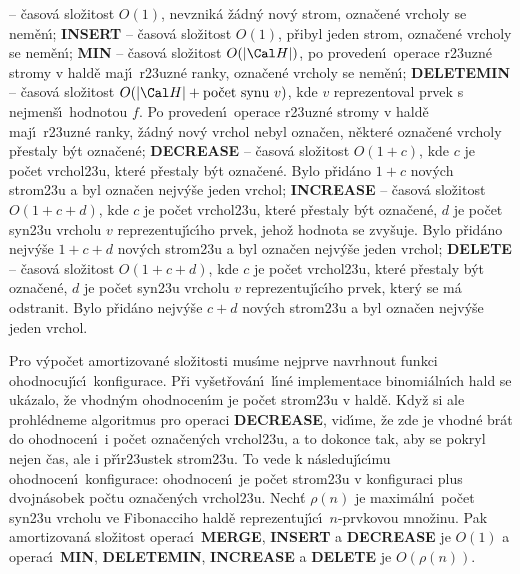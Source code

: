  -- \v casov\'a slo\v zitost $O(1)$, nevznik\'a \v z\'adn\'y 
nov\'y strom, 
ozna\-\v ce\-n\'e vrcholy se nem\v en\'\i ;\newline 
{\bf INSERT} -- \v casov\'a slo\v zitost $O(1)$, p\v ribyl jeden strom, 
ozna\v cen\'e vrcholy se nem\v en\'\i ;\newline 
{\bf MIN} -- \v casov\'a slo\v zitost $O(|\Cal H|)$, po proveden\'\i\ operace 
r\accent23uzn\'e stro\-my v hald\v e maj\'\i\ r\accent23uzn\'e 
ranky, ozna\v cen\'e vrcholy se nem\v en\'\i ;\newline 
{\bf DELETEMIN} -- \v casov\'a slo\v zitost $O(|\Cal H|+\text{\rm po\v cet syn\accent23u }
v)$,
kde $v$ reprezentoval prvek s nej\-men\v s\'\i\ hodnotou $f$. Po 
proveden\'\i\ ope\-ra\-ce r\accent23uzn\'e stromy v hald\v e maj\'\i\ 
r\accent23uzn\'e ranky, \v z\'adn\'y nov\'y vrchol nebyl 
ozna\v cen, n\v ekter\'e ozna\v cen\'e vrcholy p\v restaly b\'yt ozna\v cen\'e;\newline 
{\bf DECREASE} -- \v casov\'a slo\v zitost $O(1+c)$, kde $c$ je po\v cet 
vrchol\accent23u, kter\'e p\v restaly b\'yt ozna\v cen\'e. 
Bylo p\v rid\'ano $1+c$ nov\'ych strom\accent23u a byl ozna\v cen 
nejv\'y\v se jeden vrchol;\newline 
{\bf INCREASE} -- \v casov\'a slo\v zitost $O(1+c+d)$, kde $c$ je po\v cet 
vrchol\accent23u, kter\'e p\v restaly b\'yt ozna\v cen\'e, $d$ je 
po\v cet syn\accent23u vrcholu $v$ reprezentuj\'\i c\'\i ho prvek, 
jeho\v z hodnota se zvy\v suje. Bylo p\v rid\'ano nejv\'y\v se $1
+c+d$ 
nov\'ych strom\accent23u a byl ozna\v cen nejv\'y\v se jeden 
vrchol;\newline 
{\bf DELETE} -- \v casov\'a slo\v zitost $O(1+c+d)$, kde $c$ je po\v cet 
vrchol\accent23u, kter\'e p\v restaly b\'yt ozna\v cen\'e, $d$ je 
po\v cet syn\accent23u vrcholu $v$ reprezentuj\'\i c\'\i ho prvek, 
kter\'y se m\'a odstranit. Bylo p\v rid\'ano nejv\'y\v se $c+d$ 
nov\'ych strom\accent23u a byl ozna\v cen nejv\'y\v se jeden 
vrchol.
\medskip

\flushpar Pro v\'ypo\v cet amortizovan\'e slo\v zitosti 
mus\'\i me nejprve navrhnout funkci ohodnocuj\'\i c\'\i\ 
konfigurace.  P\v ri vy\v set\v rov\'an\'\i\ l\'\i n\'e implementace binomi\'aln\'\i ch 
hald se uk\'azalo, \v ze vhodn\'ym ohodnocen\'\i m je po\v cet strom\accent23u 
v hald\v e. Kdy\v z si ale prohl\'edneme algoritmus pro operaci 
{\bf DECREASE}, vid\'\i me, \v ze zde je vhodn\'e br\'at do ohodnocen\'\i\ i 
po\v cet ozna\v cen\'ych vrchol\accent23u, a to dokonce tak, aby 
se pokryl 
nejen \v cas, ale i p\v r\'\i r\accent23ustek strom\accent23u. To vede k 
n\'asleduj\'\i c\'\i mu ohodnocen\'\i\ konfigurace: ohodnocen\'\i\ je po\v cet 
strom\accent23u v konfiguraci plus dvojn\'asobek po\v ctu 
ozna\v cen\'ych vrchol\accent23u.
\medskip
\flushpar Nech\v t $\rho (n)$ je maxim\'aln\'\i\ 
po\v cet syn\accent23u vrcholu ve Fibonacciho hald\v e 
reprezentuj\'\i c\'\i\ $n$-prvkovou mno\v zinu.  Pak amortizovan\'a 
slo\v zitost operac\'\i\ {\bf MERGE}, {\bf INSERT} a {\bf DECREASE} je $
O(1)$ a 
operac\'\i\ {\bf MIN}, {\bf DELETEMIN}, {\bf INCREASE} a {\bf DELETE} je $
O(\rho (n))$.
\medskip

